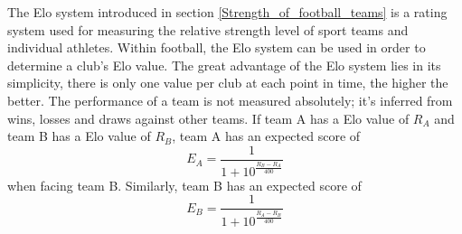 The Elo system introduced in section \ref{Strength_of_football_teams} is a rating system used for measuring the relative strength level of sport teams and individual athletes. Within football, the Elo system can be used in order to determine a club's Elo value. The great advantage of the Elo system lies in its simplicity, there is only one value per club at each point in time, the higher the better. 
\newpar
The performance of a team is not measured absolutely; it's inferred from wins, losses and draws against other teams. If team A has a Elo value of $R_A$ and team B has a Elo value of $R_B$, team A has an expected score of 
\begin{equation}\label{eq5.2}
    E_A = \frac{1}{1+10^{\frac{R_B - R_A}{400}}}
\end{equation}
when facing team B. Similarly, team B has an expected score of
\begin{equation}\label{eq5.3}
    E_B = \frac{1}{1+10^{\frac{R_A - R_B}{400}}}
\end{equation}

